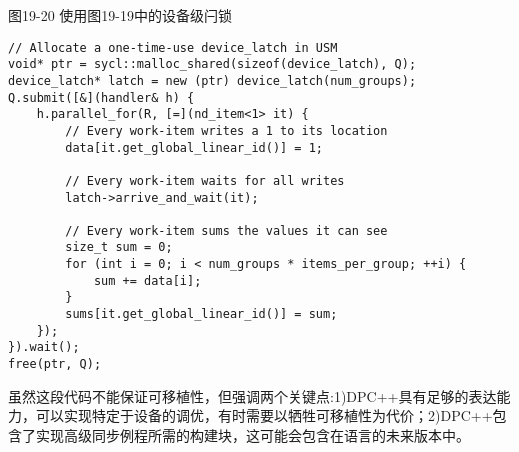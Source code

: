 \hspace*{\fill} \par %
图19-20 使用图19-19中的设备级闩锁
\begin{lstlisting}[caption={}]
// Allocate a one-time-use device_latch in USM
void* ptr = sycl::malloc_shared(sizeof(device_latch), Q);
device_latch* latch = new (ptr) device_latch(num_groups);
Q.submit([&](handler& h) {
	h.parallel_for(R, [=](nd_item<1> it) {
		// Every work-item writes a 1 to its location
		data[it.get_global_linear_id()] = 1;
		
		// Every work-item waits for all writes
		latch->arrive_and_wait(it);
		
		// Every work-item sums the values it can see
		size_t sum = 0;
		for (int i = 0; i < num_groups * items_per_group; ++i) {
			sum += data[i];
		}
		sums[it.get_global_linear_id()] = sum;
	});
}).wait();
free(ptr, Q);
\end{lstlisting}

虽然这段代码不能保证可移植性，但强调两个关键点:1)DPC++具有足够的表达能力，可以实现特定于设备的调优，有时需要以牺牲可移植性为代价；2)DPC++包含了实现高级同步例程所需的构建块，这可能会包含在语言的未来版本中。\par









































